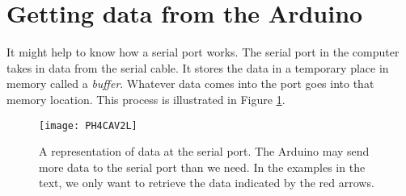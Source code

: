 %
%
%
%

\section{Getting data from the Arduino}

It might help to know how a serial port works. The serial port in the
computer takes in data from the serial cable. It stores the data in a
temporary place in memory called a \emph{buffer}. Whatever data comes into
the port goes into that memory location. This process is illustrated in
Figure \ref{fig:serial_data}.
\begin{figure}[htbp!]
    \centering
\texttt{[image: PH4CAV2L]}
    \caption[A representation of data at the serial port]{A representation
    of data at the serial port. The Arduino may send more data to the 
    serial port than we need. In the examples in the text, we only want to
    retrieve the data indicated by the red arrows.}
    \label{fig:serial_data}
\end{figure}

